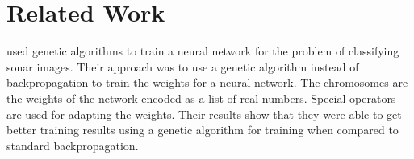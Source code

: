 \chapter[Related Work]{Related Work}

\cite{montana} used genetic algorithms to train a neural network for
the problem of classifying sonar images.
Their approach was to use a genetic algorithm instead of
backpropagation to train the weights for a neural network.
The chromosomes are the weights of the network encoded as a list of
real numbers.
Special operators are used for adapting the weights.
Their results show that they were able to get better training results
using a genetic algorithm for training when compared to standard
backpropagation.

\cite{whitley} 


 

